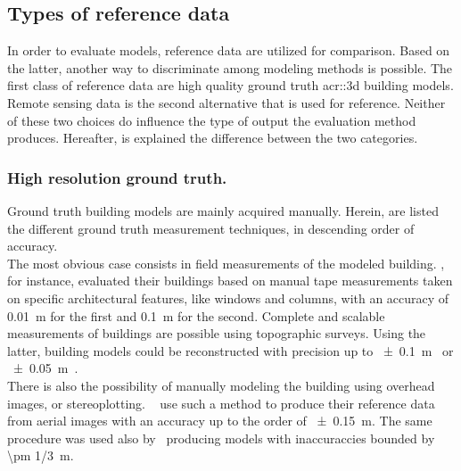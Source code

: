     \subsection{Types of reference data}
        \label{subsec::state_of_the_art::quality::reference}
        In order to evaluate models, reference data are utilized for comparison.
        Based on the latter, another way to discriminate among modeling methods is possible.
        The first class of reference data are high quality ground truth \gls{acr::3d} building models.
        Remote sensing data is the second alternative that is used for reference.
        Neither of these two choices do influence the type of output the evaluation method produces.
        Hereafter, is explained the difference between the two categories.

        \subsubsection{High resolution ground truth.}
            Ground truth building models are mainly acquired manually.
            Herein, are listed the different ground truth measurement techniques, in descending order of accuracy.\\

            The most obvious case consists in field measurements of the modeled building.
            \textcite{dick2004modelling}, for instance, evaluated their buildings based on manual tape measurements taken on specific architectural features, like windows and columns, with an accuracy of \SI{0.01}{\m} for the first and \SI{0.1}{\m} for the second.
            Complete and scalable measurements of buildings are possible using topographic surveys.
            Using the latter, building models could be reconstructed with precision up to \SI{\pm 0.1}{\m}~\parencite{henricsson19973} or \SI{\pm 0.05}{\m}~\parencite{vogtle2003quality}.\\
            There is also the possibility of manually modeling the building using overhead images, or stereoplotting.
            ~\textcite{zebedin2008fusion} use such a method to produce their reference data from aerial images with an accuracy up to the order of \SI{\pm 0.15}{\m}.
            The same procedure was used also by~\textcite{jaynes2003recognition} producing models with inaccuraccies bounded by \SI[fraction-function = \sfrac]{\pm 1/3}{\m}.


